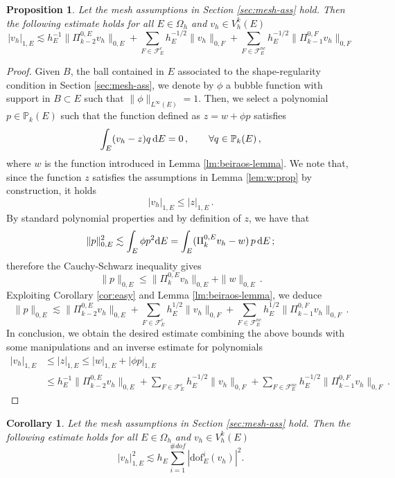 \documentclass[a4paper,11pt]{article}
\newtheorem{proposition}[theorem]{Proposition}
\newtheorem{corollary}[theorem]{Corollary}
\theoremstyle{remark}
\theoremstyle{definition}
\newcommand{\PiZeroE}{\Pi^{0,E}_k}
\begin{document}
\begin{proposition}\label{prop:judoboy}
Let the mesh assumptions in Section \ref{sec:mesh-ass} hold.
Then  the following estimate holds for all $E \in \Omega_h$ and $v_h \in V_h^k(E)$
\[
|v_h|_{1,E} 
\lesssim h_E^{-1} \| \Pi^{0,E}_{k-2} v_h \|_{0,E}
+ \sum_{F \in \mathcal{F}^{c}_E} h_E^{-1/2} \| v_h \|_{0,F}
+ \sum_{F \in \mathcal{F}^{nc}_E} h_E^{-1/2} \| \Pi^{0,F}_{k-1} v_h \|_{0,F}
\]
\end{proposition}
\begin{proof}
Given $B$, the ball contained in $E$ associated to the shape-regularity condition in Section \ref{sec:mesh-ass},
we denote by $\phi$ a bubble function with support in $B \subset E$ such that $\| \phi \|_{L^\infty(E)} = 1$.
Then, we select a polynomial $p \in \mathbb{P}_k(E)$ such that the function defined as $z = w + \phi p$ satisfies
\[
\int_E (v_h - z) q \, {\rm d }E = 0 \, , \qquad \forall q \in \mathbb{P}_k(E) \, ,
\]
where $w$ is the function introduced in Lemma \ref{lm:beiraos-lemma}.
We note that, since the function $z$ satisfies the assumptions in Lemma \ref{lem:w:prop} by construction, it holds
\[
|v_h|_{1,E} \leq | z |_{1,E} \, .
\]
By standard polynomial properties and by definition of $z$, we have that
\[
\| p \|^2_{0,E}
\lesssim
\int_E \phi p^2 {\rm d}E
=
\int_E (\PiZeroE v_h - w) \, p \,  {\rm d}E \, ;
\]
therefore the Cauchy-Schwarz inequality gives
\[
\| p \|_{0,E} 
\leq 
\| \PiZeroE v_h\|_{0,E} + \| w \|_{0,E} \, .
\]
Exploiting Corollary \ref{cor:easy} and Lemma \ref{lm:beiraos-lemma}, we deduce
\[
\| p \|_{0,E} 
\lesssim
 \| \Pi^{0,E}_{k-2} v_h \|_{0,E}
+ \sum_{F \in \mathcal{F}^{c}_E} h_E^{1/2} \| v_h \|_{0,F}
+ \sum_{F \in \mathcal{F}^{nc}_E} h_E^{1/2} \| \Pi^{0,F}_{k-1} v_h \|_{0,F} \, .
\]
In conclusion, we obtain the desired estimate 
combining the above bounds with some manipulations and an inverse estimate for polynomials
\[
\begin{aligned}
|v_h|_{1,E} &\leq | z |_{1,E}
\leq | w |_{1,E} + | \phi p|_{1,E} \\
&\leq h_E^{-1} \| \Pi^{0,E}_{k-2} v_h \|_{0,E}
+ \sum_{F \in \mathcal{F}^{c}_E} h_E^{-1/2} \| v_h \|_{0,F}
+ \sum_{F \in \mathcal{F}^{nc}_E} h_E^{-1/2} \| \Pi^{0,F}_{k-1} v_h \|_{0,F} \, .
\end{aligned}
\]
 \end{proof}

\begin{corollary} \label{cor:stab_upper_bound}
Let the mesh assumptions in Section \ref{sec:mesh-ass} hold.
Then  the following estimate holds for all $E \in \Omega_h$ and $v_h \in V_h^k(E)$
\begin{equation}
|v_h|_{1,E}^2 \lesssim h_E \sum_{i=1}^{\#dof} |\text{dof}_E^i(v_h)|^2.
\end{equation}
\end{corollary}
\end{document}
